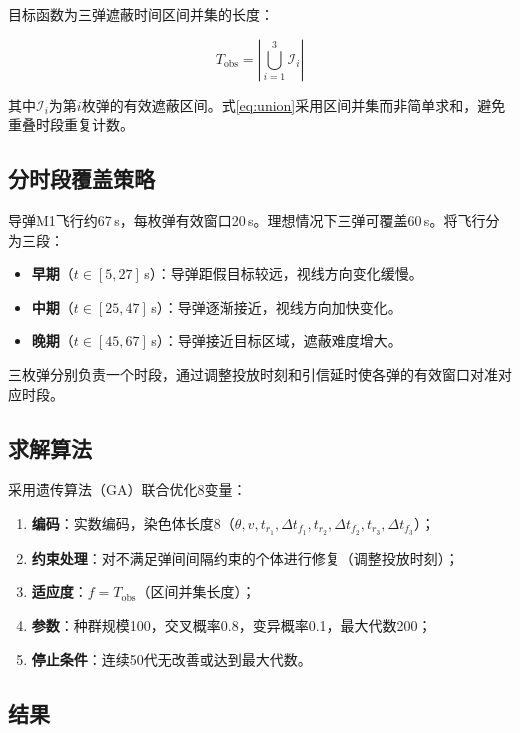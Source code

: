 \documentclass[a4paper]{ctexart}
\begin{document}
目标函数为三弹遮蔽时间区间并集的长度：

\begin{equation}
T_{\text{obs}} = \left| \bigcup_{i=1}^{3} \mathcal{I}_i \right|
\label{eq:union}
\end{equation}

其中$\mathcal{I}_i$为第$i$枚弹的有效遮蔽区间。式\eqref{eq:union}采用区间并集而非简单求和，避免重叠时段重复计数。

\subsection{分时段覆盖策略}

导弹M1飞行约67\,s，每枚弹有效窗口20\,s。理想情况下三弹可覆盖60\,s。将飞行分为三段：

\begin{itemize}
  \item \textbf{早期}（$t \in [5, 27]$\,s）：导弹距假目标较远，视线方向变化缓慢。
  \item \textbf{中期}（$t \in [25, 47]$\,s）：导弹逐渐接近，视线方向加快变化。
  \item \textbf{晚期}（$t \in [45, 67]$\,s）：导弹接近目标区域，遮蔽难度增大。
\end{itemize}

三枚弹分别负责一个时段，通过调整投放时刻和引信延时使各弹的有效窗口对准对应时段。

\subsection{求解算法}

采用遗传算法（GA）联合优化8变量：
\begin{enumerate}[label=\textbf{步骤\arabic*：}]
  \item \textbf{编码}：实数编码，染色体长度8（$\theta, v, t_{r_1}, \Delta t_{f_1}, t_{r_2}, \Delta t_{f_2}, t_{r_3}, \Delta t_{f_3}$）；
  \item \textbf{约束处理}：对不满足弹间间隔约束的个体进行修复（调整投放时刻）；
  \item \textbf{适应度}：$f = T_{\text{obs}}$（区间并集长度）；
  \item \textbf{参数}：种群规模100，交叉概率0.8，变异概率0.1，最大代数200；
  \item \textbf{停止条件}：连续50代无改善或达到最大代数。
\end{enumerate}

\subsection{结果}
\end{document}
